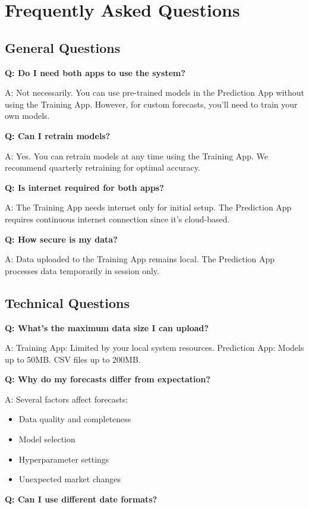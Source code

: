 \chapter{Frequently Asked Questions}

\section{General Questions}

\textbf{Q: Do I need both apps to use the system?}

A: Not necessarily. You can use pre-trained models in the Prediction App without using the Training App. However, for custom forecasts, you'll need to train your own models.

\textbf{Q: Can I retrain models?}

A: Yes. You can retrain models at any time using the Training App. We recommend quarterly retraining for optimal accuracy.

\textbf{Q: Is internet required for both apps?}

A: The Training App needs internet only for initial setup. The Prediction App requires continuous internet connection since it's cloud-based.

\textbf{Q: How secure is my data?}

A: Data uploaded to the Training App remains local. The Prediction App processes data temporarily in session only.

\section{Technical Questions}

\textbf{Q: What's the maximum data size I can upload?}

A: Training App: Limited by your local system resources. Prediction App: Models up to 50MB. CSV files up to 200MB.

\textbf{Q: Why do my forecasts differ from expectation?}

A: Several factors affect forecasts:
\begin{itemize}
	\item Data quality and completeness
	\item Model selection
	\item Hyperparameter settings
	\item Unexpected market changes
\end{itemize}

\textbf{Q: Can I use different date formats?}

